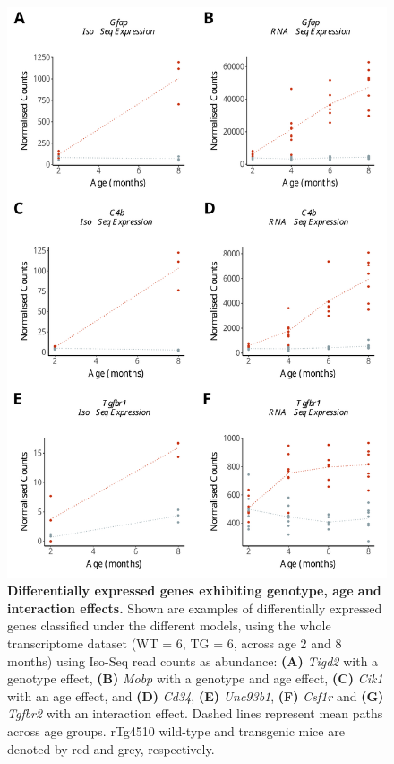   
\begin{figure}[h]
	\centering
	\includegraphics[page=5,scale = 0.55]{Figures/WholeDifferentialAnalysis.pdf}
	\captionsetup{width=0.95\textwidth}
	\caption[Examples of differential expression associated with genotype, age \& interaction effects]%
	{\textbf{Differentially expressed genes exhibiting genotype, age and interaction effects.} Shown are examples of differentially expressed genes classified under the different models, using the whole transcriptome dataset (WT = 6, TG = 6, across age 2 and 8 months) using Iso-Seq read counts as abundance: \textbf{(A)} \textit{Tigd2} with a genotype effect, \textbf{(B)} \textit{Mobp} with a genotype and age effect, \textbf{(C)} \textit{Cik1} with an age effect, and \textbf{(D)} \textit{Cd34}, \textbf{(E)} \textit{Unc93b1}, \textbf{(F)} \textit{Csf1r} and \textbf{(G)} \textit{Tgfbr2} with an interaction effect. Dashed lines represent mean paths across age groups. rTg4510 wild-type and transgenic mice are denoted by red and grey, respectively. }   
	\label{fig:dea_model_genexp}
\end{figure}
 
